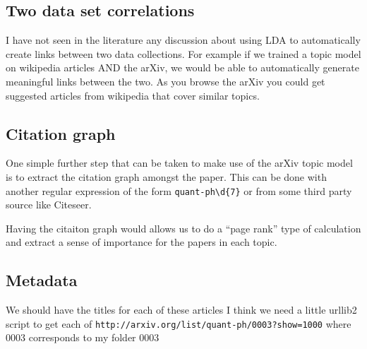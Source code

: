 \documentclass[letterpaper,12pt]{article}
\begin{document}
		


    \subsection{Two data set correlations}

        I have not seen in the literature any discussion about using LDA to automatically
        create links between two data collections.
        For example if we trained a topic model on wikipedia articles AND the arXiv,
        we would be able to automatically generate meaningful links between the two.
        As you browse the arXiv you could get suggested articles from wikipedia that cover similar topics.


			
    \subsection{Citation graph}

        One simple further step that can be taken to make use of the arXiv topic model 
        is to extract the citation graph amongst the paper. This can be done with another
        regular expression of the form \verb|quant-ph\d{7}| or from some third party
        source like Citeseer.
        
        Having the citaiton graph would allows us to do a ``page rank'' type of calculation
        and extract a sense of importance for the papers in each topic.


    \subsection{Metadata}
        We should have the titles for each of these articles I think
        we need a little urllib2 script to get each of
        \verb|http://arxiv.org/list/quant-ph/0003?show=1000|
        where 0003 corresponds to my folder 0003 


    
    \vspace{0.3in}
\end{document}
